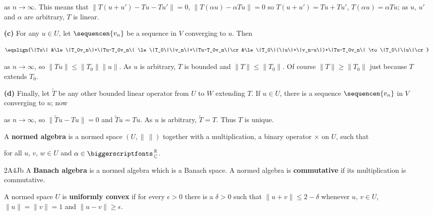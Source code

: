 {\noindent as $n\to\infty$.   This means that $\|T(u+u')-Tu-Tu'\|=0$, 
$\|T(\alpha u)-\alpha Tu\|=0$ so $T(u+u')=Tu+Tu'$, $T(\alpha u)=\alpha 
Tu$;  as $u$, $u'$ and $\alpha$ are arbitrary, $T$ is linear. 
 
\medskip 
 
{\bf (c)} For any $u\in U$, let $\sequencen{v_n}$ be a sequence in $V$ 
converging to $u$.   Then 
 
$$\eqalign{\|Tu\| 
&\le\|T_0v_n\|+\|Tu-T_0v_n\| 
\le\|T_0\|\|v_n\|+\|Tu-T_0v_n\|\cr 
&\le\|T_0\|(\|u\|+\|v_n-u\|)+\|Tu-T_0v_n\| 
\to\|T_0\|\|u\|\cr}$$ 
 
\noindent as $n\to\infty$, so $\|Tu\|\le\|T_0\|\|u\|$.   As $u$ is 
arbitrary, $T$ is bounded and $\|T\|\le\|T_0\|$.  Of course 
$\|T\|\ge\|T_0\|$ just because $T$ extends $T_0$. 
 
\medskip 
 
{\bf (d)} Finally, let $\tilde T$ be any other bounded linear operator 
from $U$ to $W$ extending $T$.   If $u\in U$, there is a sequence 
$\sequencen{v_n}$ in $V$ converging to $u$;  now 
 
 
\noindent as $n\to\infty$, so $\|\tilde Tu-Tu\|=0$ and $\tilde Tu=Tu$. 
As $u$ is arbitrary, $\tilde T=T$.   Thus $T$ is unique. 
}%
 
 A {\bf normed algebra} is a normed 
space $(U,\|\,\|)$ together with a multiplication, a binary operator 
$\times$ on $U$, such that 
 
 
 
 
 
\noindent for all $u$, $v$, $w\in U$ and $\alpha\in\RoverC$. 
 
\spheader 2A4Jb A {\bf Banach algebra} is a normed algebra which is a 
Banach space.   A normed algebra is {\bf commutative} if its multiplication is commutative. 
 
 A  
normed space $U$ is {\bf uniformly convex} if 
for every $\epsilon>0$ there is a $\delta>0$ such that  
$\|u+v\|\le 2-\delta$ whenever $u$, $v\in U$, $\|u\|=\|v\|=1$ and  
$\|u-v\|\ge\epsilon$. 
 
\discrpage 
 
